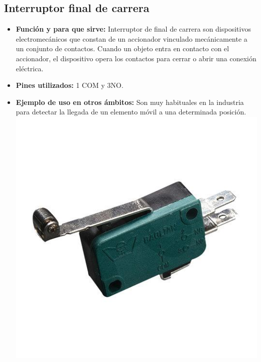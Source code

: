 \documentclass[12pt]{article}
\begin{document}
    \subsection{Interruptor final de carrera}
    \begin{itemize}
         \item \textbf{Función y para que sirve: }Interruptor de final de carrera son dispositivos electromecánicos que constan de un accionador vinculado mecánicamente a un conjunto de contactos. Cuando un objeto entra en contacto con el accionador, el dispositivo opera los contactos para cerrar o abrir una conexión eléctrica.
         \item \textbf{Pines utilizados: }1 COM y 3NO.
         \item\textbf{Ejemplo de uso en otros ámbitos: }Son muy habituales en la industria para detectar la llegada de un elemento móvil a una determinada posición.
        \newline
        \includegraphics[scale =0.7]{finaldecarrera.png}\\[1.0 cm]
    \end{itemize}{}
\end{document}

